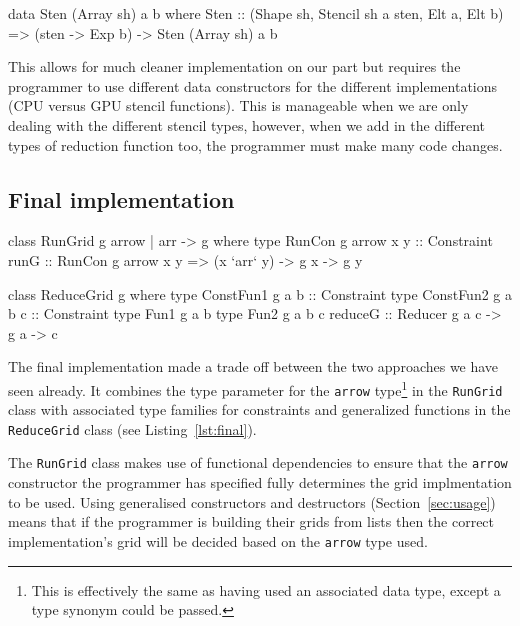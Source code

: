 \documentclass[
    12pt,
    a4paper,
    twoside,
    openright,
    ]{scrbook}
\begin{document}
\begin{hlisting}[label=lst:stendatafam,
caption={An example of a stencil data type for the GPU. Note the argument it takes is a stencil function (of type \texttt{sten -> Exp b}) where \texttt{sten} has been constrained in the required way.}]
data Sten (Array sh) a b where
        Sten :: (Shape sh, Stencil sh a sten,
                 Elt a, Elt b) =>
                (sten -> Exp b)
                -> Sten (Array sh) a b
\end{hlisting}

This allows for much cleaner implementation on
our part but requires the programmer to use different data constructors for the
different implementations (CPU versus GPU stencil functions). This is manageable
when we are only dealing with the different stencil types, however, when we add
in the different types of reduction function too, the programmer must make many
code changes.

\subsection{Final implementation}
\label{sec:final}

\begin{hflisting}[label=lst:final, caption={The final signatures of the
  \texttt{RunGrid} and \texttt{ReduceGrid} classes.}]
class RunGrid g arrow | arr -> g where
    type RunCon g arrow x y :: Constraint
    runG :: RunCon g arrow x y =>
            (x `arr` y)
            -> g x -> g y

class ReduceGrid g where
    type ConstFun1 g a b :: Constraint
    type ConstFun2 g a b c :: Constraint
    type Fun1 g a b
    type Fun2 g a b c
    reduceG :: Reducer g a c -> g a -> c
\end{hflisting}

The final implementation made a trade off between the two approaches we have
seen already. It combines the type parameter for the \texttt{arrow}
type\footnote{This is effectively the same as having used an associated data
  type, except a type synonym could be passed.} in the \texttt{RunGrid} class
with associated type families for constraints and generalized functions in the
\texttt{ReduceGrid} class (see Listing~\ref{lst:final}).

The \texttt{RunGrid} class makes use of functional dependencies to ensure that
the \texttt{arrow} constructor the programmer has specified fully determines the
grid implmentation to be used. Using generalised constructors and destructors
(Section~\ref{sec:usage}) means that if the programmer is building their grids
from lists then the correct implementation's grid will be decided based on the
\texttt{arrow} type used.
\end{document}
